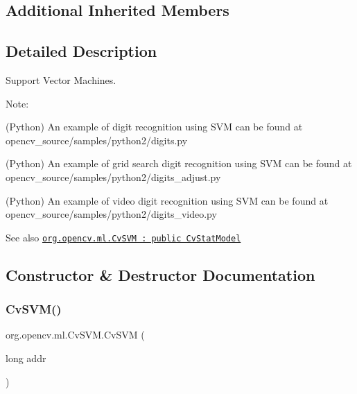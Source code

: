 \subsection*{Additional Inherited Members}


\subsection{Detailed Description}
Support Vector Machines.

Note\+:


\begin{DoxyItemize}
\item (Python) An example of digit recognition using S\+VM can be found at opencv\+\_\+source/samples/python2/digits.\+py 
\item (Python) An example of grid search digit recognition using S\+VM can be found at opencv\+\_\+source/samples/python2/digits\+\_\+adjust.\+py 
\item (Python) An example of video digit recognition using S\+VM can be found at opencv\+\_\+source/samples/python2/digits\+\_\+video.\+py 
\end{DoxyItemize}

\begin{DoxySeeAlso}{See also}
\href{http://docs.opencv.org/modules/ml/doc/support_vector_machines.html#cvsvm}{\tt org.\+opencv.\+ml.\+Cv\+S\+VM \+: public Cv\+Stat\+Model} 
\end{DoxySeeAlso}


\subsection{Constructor \& Destructor Documentation}
\mbox{\label{classorg_1_1opencv_1_1ml_1_1_cv_s_v_m_a10441681278e244e8ebfbf2ed14862c4}} 
\subsubsection{\texorpdfstring{Cv\+S\+V\+M()}{CvSVM()}\hspace{0.1cm}{\footnotesize\ttfamily [1/4]}}
{\footnotesize\ttfamily org.\+opencv.\+ml.\+Cv\+S\+V\+M.\+Cv\+S\+VM (\begin{DoxyParamCaption}\item[{long}]{addr }\end{DoxyParamCaption})\hspace{0.3cm}{\ttfamily [protected]}}

